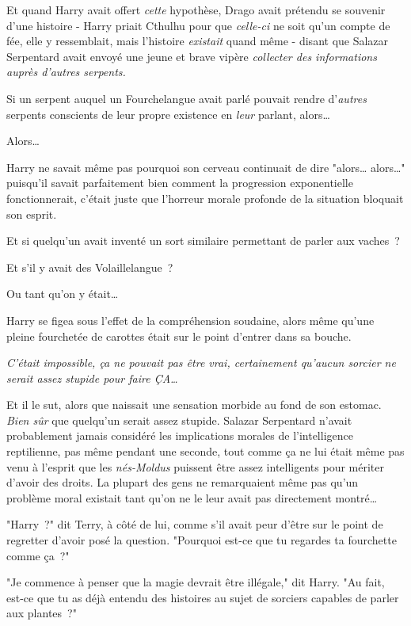 Et quand Harry avait offert \emph{cette} hypothèse, Drago avait prétendu se souvenir d'une histoire - Harry priait Cthulhu pour que \emph{celle-ci} ne soit qu'un compte de fée, elle y ressemblait, mais l'histoire \emph{existait} quand même - disant que Salazar Serpentard avait envoyé une jeune et brave vipère \emph{collecter des informations auprès d'autres serpents.}

Si un serpent auquel un Fourchelangue avait parlé pouvait rendre d'\emph{autres} serpents conscients de leur propre existence en \emph{leur} parlant, alors…

Alors…

Harry ne savait même pas pourquoi son cerveau continuait de dire "alors… alors…" puisqu'il savait parfaitement bien comment la progression exponentielle fonctionnerait, c'était juste que l'horreur morale profonde de la situation bloquait son esprit.

Et si quelqu'un avait inventé un sort similaire permettant de parler aux vaches~?

Et s'il y avait des Volaillelangue~?

Ou tant qu'on y était…

Harry se figea sous l'effet de la compréhension soudaine, alors même qu'une pleine fourchetée de carottes était sur le point d'entrer dans sa bouche.

\emph{C'était impossible, ça ne pouvait pas être vrai, certainement qu'aucun sorcier ne serait assez stupide pour faire ÇA…}

Et il le sut, alors que naissait une sensation morbide au fond de son estomac. \emph{Bien sûr} que quelqu'un serait assez stupide. Salazar Serpentard n'avait probablement jamais considéré les implications morales de l'intelligence reptilienne, pas même pendant une seconde, tout comme ça ne lui était même pas venu à l'esprit que les \emph{nés-Moldus} puissent être assez intelligents pour mériter d'avoir des droits. La plupart des gens ne remarquaient même pas qu'un problème moral existait tant qu'on ne le leur avait pas directement montré…

"Harry~?" dit Terry, à côté de lui, comme s'il avait peur d'être sur le point de regretter d'avoir posé la question. "Pourquoi est-ce que tu regardes ta fourchette comme ça~?"

"Je commence à penser que la magie devrait être illégale," dit Harry. "Au fait, est-ce que tu as déjà entendu des histoires au sujet de sorciers capables de parler aux plantes~?"

\later

